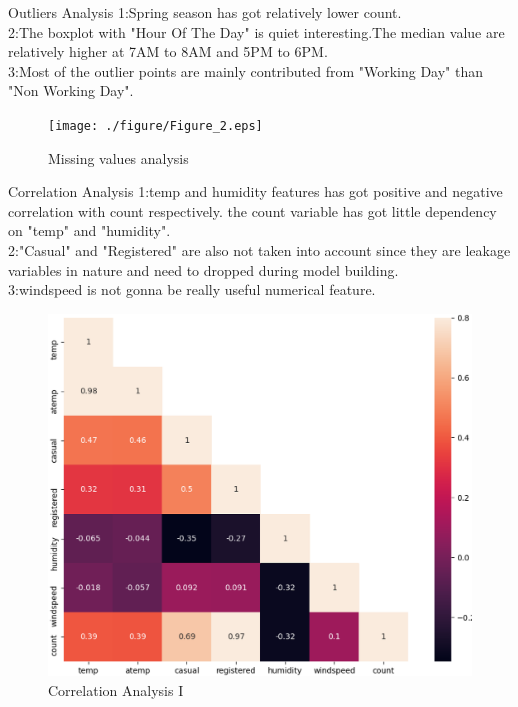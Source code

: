 \documentclass[
 size=14pt,
 paper=smartboard,  %
 mode=present, 		%
 display=slides, 	%
 style=tuliplab,  	%
 pauseslide,
 fleqn,leqno]{powerdot}
\begin{document}
\begin{slide}{Outliers Analysis}
1:Spring season has got relatively lower count. \\
2:The boxplot with "Hour Of The Day" is quiet interesting.The median value are relatively higher at 7AM to 8AM and 5PM to 6PM.\\
3:Most of the outlier points are mainly contributed from "Working Day" than "Non Working Day". 
\begin{figure}[htbp]
	\texttt{[image: ./figure/Figure\_2.eps]}
	\caption{Missing values analysis}
\end{figure}
\end{slide}

\begin{slide}{Correlation Analysis}
	1:temp and humidity features has got positive and negative correlation with count respectively. the count variable has got little dependency on "temp" and "humidity". \\
	2:"Casual" and "Registered" are also not taken into account since they are leakage variables in nature and need to dropped during model building. \\
	3:windspeed is not gonna be really useful numerical feature.
	\begin{figure}[htbp]
		\includegraphics[scale=0.4]{./figure/Figure_3.eps}
		\caption{Correlation Analysis I}
	\end{figure}
\end{slide}
\end{document}
